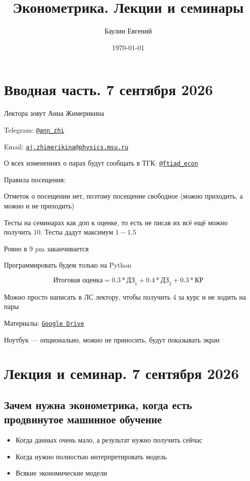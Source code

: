 \documentclass[12pt,a4paper]{article}
\title{Эконометрика. Лекции и семинары}
\author{Баулин Евгений}
\date{\today}
\numberwithin{equation}{section}
\theoremstyle{plain}
\theoremstyle{definition}
\theoremstyle{remark}
\begin{document}

\maketitle
\tableofcontents
\clearpage

\section{Вводная часть. 7 сентября 2026}

Лектора зовут Анна Жимерикина

Telegram: \href{https://t.me/ann_zhi}{\texttt{@ann\_zhi}}

Email: \href{mailto:aj.zhimerikina@physics.msu.ru}{\nolinkurl{aj.zhimerikina@physics.msu.ru}}

О всех изменениях о парах будут сообщать в ТГК: \href{https://t.me/ftiad_econ}{\texttt{@ftiad\_econ}}

Правила посещения:

Отметок о посещении нет, поэтому посещение свободное (можно приходить, а можно и не приходить)

Тесты на семинарах как доп к оценке, то есть не писав их всё ещё можно получить $10$. Тесты дадут максимум $1-1.5$

Ровно в 9 pm заканчивается

Программировать будем только на Python

$$
    \text{Итоговая оценка} = 0.3 * \text{ДЗ}_1 + 0.4 * \text{ДЗ}_2 + 0.3 * \text{КР}
$$

Можно просто написать в ЛС лектору, чтобы получить 4 за курс и не ходить на пары

Материалы: \href{https://drive.google.com/drive/folders/1e8s9vTZWyk2HHJh6tHfEJ-FtTs13sTG0}{\texttt{Google Drive}}

Ноутбук — опционально, можно не приносить, будут показывать экран

\section{Лекция и семинар. 7 сентября 2026}

\subsection{Зачем нужна эконометрика, когда есть продвинутое машинное обучение}

\begin{itemize}
    \item Когда данных очень мало, а результат нужно получить сейчас
    \item Когда нужно полностью интерпретировать модель
    \item Всякие экономические модели
\end{itemize}
\end{document}
